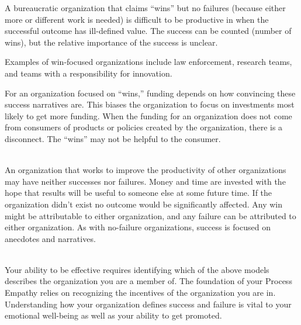 A bureaucratic organization that claims ``wins'' but no failures (because either more or different work is needed) is difficult to be productive in when the successful outcome has ill-defined value. The success can be counted (number of wins), but the relative importance of the success is unclear.

Examples of win-focused organizations include law enforcement, research teams, and teams with a responsibility for innovation. 

For an organization focused on ``wins,'' funding depends on how convincing these success narratives are. This biases the organization to focus on investments most likely to get more funding. When the funding for an organization does not come from consumers of products or policies created by the organization, there is a disconnect. The ``wins'' may not be helpful to the consumer.


\ \\

An organization that works to improve the productivity of other organizations may have neither successes nor failures. Money and time are invested with the hope that results will be useful to someone else at some future time. If the organization didn't exist no outcome would be significantly affected. Any win might be attributable to either organization, and any failure can be attributed to either organization. As with no-failure organizations, success is focused on anecdotes and narratives. 

\ \\

Your ability to be effective requires identifying which of the above models describes the organization you are a member of. The foundation of your Process Empathy relies on recognizing the incentives of the organization you are in.
Understanding how your organization defines success and failure is vital to your emotional well-being as well as your ability to get promoted. %
